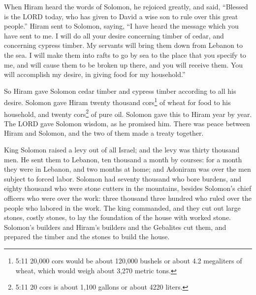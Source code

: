 \myverse{}When Hiram heard the words of Solomon, he rejoiced greatly, and
said, “Blessed is the LORD today, who has given to David a wise son to rule over this great people.”
\myverse{}Hiram sent to Solomon, saying, “I have heard the message which you have sent
to me. I will do all your desire concerning timber of cedar, and concerning cypress timber.
\myverse{}My servants will bring them down from Lebanon to the sea. I will make them into
rafts to go by sea to the place that you specify to me, and will cause them to be broken up there, and
you will receive them. You will accomplish my desire, in giving food for my household.”

\myverse{}So Hiram gave Solomon cedar timber and cypress timber according
to all his desire.
\myverse{}Solomon gave Hiram twenty thousand cors\footnote{5:11 20,000 cors would be about 120,000 bushels or about 4.2 megaliters of wheat, which would weigh
	about 3,270 metric tons.} of wheat for food to his household, and twenty cors\footnote{5:11 20 cors is about 1,100 gallons or about 4220 liters.} of pure oil. Solomon gave this
to Hiram year by year.
\myverse{}The LORD gave Solomon wisdom, as he promised him. There was peace between
Hiram and Solomon, and the two of them made a treaty together.

\myverse{}King Solomon raised a levy out of all Israel; and the levy was
thirty thousand men.
\myverse{}He sent them to Lebanon, ten thousand a month by courses: for a month they
were in Lebanon, and two months at home; and Adoniram was over the men subject to forced labor.
\myverse{}Solomon had seventy thousand who bore burdens, and eighty thousand who were
stone cutters in the mountains,
\myverse{}besides Solomon’s chief officers who were over the work: three thousand three
hundred who ruled over the people who labored in the work.
\myverse{}The king commanded, and they cut out large stones, costly stones, to lay the
foundation of the house with worked stone.
\myverse{}Solomon’s builders and Hiram’s builders and the Gebalites cut them, and prepared
the timber and the stones to build the house.


